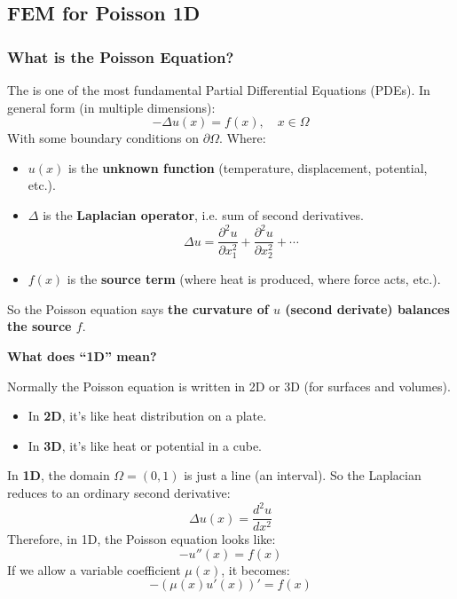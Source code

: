 \subsection{FEM for Poisson 1D}

\subsubsection{What is the Poisson Equation?}

The  is one of the most fundamental Partial Differential Equations (PDEs). In general form (in multiple dimensions):
\begin{equation}
    - \Delta u(x) = f(x), \quad x \in \Omega
\end{equation}
With some boundary conditions on $\partial \Omega$. Where:
\begin{itemize}
    \item $u(x)$ is the \textbf{unknown function} (temperature, displacement, potential, etc.).
    \item $\Delta$ is the \textbf{Laplacian operator}, i.e. sum of second derivatives.
    \begin{equation}
        \Delta u = \dfrac{\partial^{2} u}{\partial x_{1}^{2}} + \dfrac{\partial^{2} u}{\partial x_{2}^{2}} + \cdots
    \end{equation}
    \item $f(x)$ is the \textbf{source term} (where heat is produced, where force acts, etc.).
\end{itemize}
So the Poisson equation says \textbf{the curvature of $u$ (second derivate) balances the source $f$}.

\highspace
\begin{flushleft}
    \textcolor{Green3}{ \textbf{What does ``1D'' mean?}}
\end{flushleft}
Normally the Poisson equation is written in 2D or 3D (for surfaces and volumes).
\begin{itemize}
    \item In \textbf{2D}, it's like heat distribution on a plate.
    \item In \textbf{3D}, it's like heat or potential in a cube.
\end{itemize}
In \textbf{1D}, the domain $\Omega = (0,1)$ is just a line (an interval). So the Laplacian reduces to an ordinary second derivative:
\begin{equation*}
    \Delta u(x) = \frac{d^2 u}{dx^2}
\end{equation*}
Therefore, in 1D, the Poisson equation looks like:
\begin{equation}
    - u''(x) = f(x)    
\end{equation}
If we allow a variable coefficient $\mu(x)$, it becomes:
\begin{equation*}
    - \left(\mu(x) u'(x)\right)' = f(x)    
\end{equation*}

